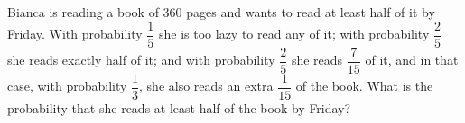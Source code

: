 Bianca is reading a book of $360$ pages and wants to read at least half of it by Friday. With probability $\dfrac15$ she is too lazy to read any of it; with probability $\dfrac25$ she reads exactly half of it; and with probability $\dfrac25$ she reads $\dfrac{7}{15}$ of it, and in that case, with probability $\dfrac13$, she also reads an extra $\dfrac{1}{15}$ of the book. What is the probability that she reads at least half of the book by Friday?
